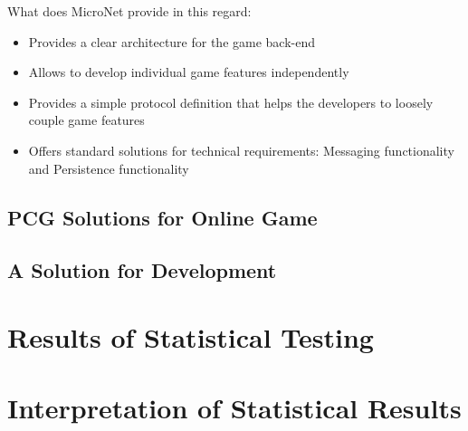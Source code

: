 What does MicroNet provide in this regard:
\begin{itemize}
  \item Provides a clear architecture for the game back-end
  \item Allows to develop individual game features independently
  \item Provides a simple protocol definition that helps the developers to loosely couple game features
  \item Offers standard solutions for technical requirements: Messaging
  functionality and Persistence functionality	
\end{itemize}

\subsection{PCG Solutions for Online Game}

\subsection{A Solution for \ms{} Development}

\section{Results of Statistical Testing}

\section{Interpretation of Statistical Results}